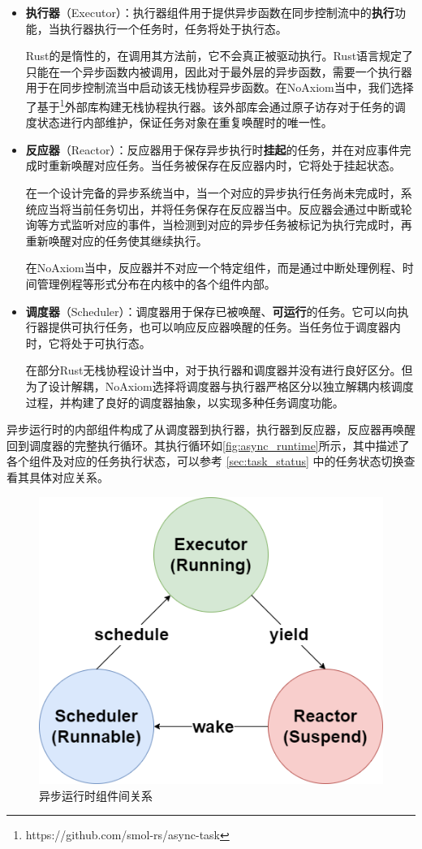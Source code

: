 \documentclass{article}
\begin{document}
\begin{itemize}
    \item \textbf{执行器}（Executor）：执行器组件用于提供异步函数在同步控制流中的\textbf{执行}功能，当执行器执行一个任务时，任务将处于执行态。
    
    Rust的是惰性的，在调用其方法前，它不会真正被驱动执行。Rust语言规定了只能在一个异步函数内被调用，因此对于最外层的异步函数，需要一个执行器用于在同步控制流当中启动该无栈协程异步函数。在NoAxiom当中，我们选择了基于\footnote{https://github.com/smol-rs/async-task}外部库构建无栈协程执行器。该外部库会通过原子访存对于任务的调度状态进行内部维护，保证任务对象在重复唤醒时的唯一性。
    
    \item \textbf{反应器}（Reactor）：反应器用于保存异步执行时\textbf{挂起}的任务，并在对应事件完成时重新唤醒对应任务。当任务被保存在反应器内时，它将处于挂起状态。
    
    在一个设计完备的异步系统当中，当一个对应的异步执行任务尚未完成时，系统应当将当前任务切出，并将任务保存在反应器当中。反应器会通过中断或轮询等方式监听对应的事件，当检测到对应的异步任务被标记为执行完成时，再重新唤醒对应的任务使其继续执行。

    在NoAxiom当中，反应器并不对应一个特定组件，而是通过中断处理例程、时间管理例程等形式分布在内核中的各个组件内部。

    \item \textbf{调度器}（Scheduler）：调度器用于保存已被唤醒、\textbf{可运行}的任务。它可以向执行器提供可执行任务，也可以响应反应器唤醒的任务。当任务位于调度器内时，它将处于可执行态。
    
    在部分Rust无栈协程设计当中，对于执行器和调度器并没有进行良好区分。但为了设计解耦，NoAxiom选择将调度器与执行器严格区分以独立解耦内核调度过程，并构建了良好的调度器抽象，以实现多种任务调度功能。
    
\end{itemize}

异步运行时的内部组件构成了从调度器到执行器，执行器到反应器，反应器再唤醒回到调度器的完整执行循环。其执行循环如\autoref{fig:async_runtime}所示，其中描述了各个组件及对应的任务执行状态，可以参考 \ref{sec:task_status} 中的任务状态切换查看其具体对应关系。

\begin{figure}[H]
    \centering
    \includegraphics[width=0.4\linewidth]{assets//sched/async_runtime.drawio.png}
    \caption{异步运行时组件间关系}
    \label{fig:async_runtime}
\end{figure}
\end{document}
